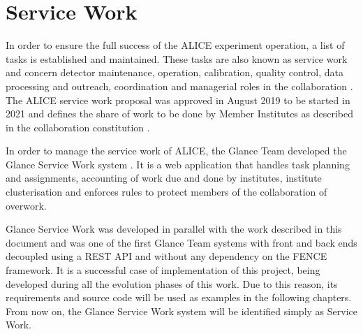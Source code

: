 \section{Service Work}

In order to ensure the full success of the ALICE experiment operation, a list of tasks is established and maintained. These tasks are also known as service work and concern detector maintenance, operation, calibration, quality control, data processing and outreach, coordination and managerial roles in the collaboration \cite{alice-collaboration-service-work}. The ALICE service work proposal was approved in August 2019 to be started in 2021 \cite{service-work-modus-operandi} and defines the share of work to be done by Member Institutes as described in the collaboration constitution \cite{alice-constitution}.

In order to manage the service work of ALICE, the Glance Team developed the Glance Service Work system \cite{alice-glance-sw-website}. It is a web application that handles task planning and assignments, accounting of work due and done by institutes, institute clusterisation and enforces rules to protect members of the collaboration of overwork.

Glance Service Work was developed in parallel with the work described in this document and was one of the first Glance Team systems with front and back ends decoupled using a REST API and without any dependency on the FENCE framework. It is a successful case of implementation of this project, being developed during all the evolution phases of this work. Due to this reason, its requirements and source code will be used as examples in the following chapters. From now on, the Glance Service Work system will be identified simply as Service Work.
